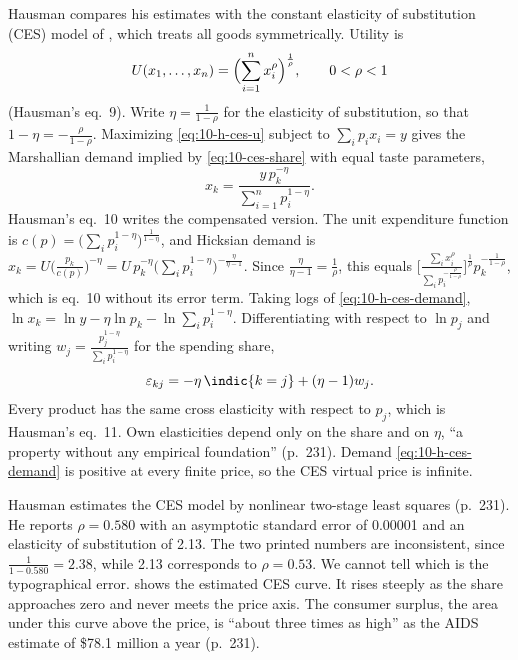Hausman compares his estimates with the constant elasticity of substitution (CES) model of
\citet{DixitStiglitz1977}, which treats all goods symmetrically. Utility is
\begin{equation}\label{eq:10-h-ces-u}
  U(x_1,\dots,x_n) = \Bigl(\sum_{i=1}^{n}x_i^{\rho}\Bigr)^{\frac{1}{\rho}}, \qquad 0 < \rho < 1
\end{equation}
(Hausman's eq.~9). Write $\eta = \frac{1}{1-\rho}$ for the elasticity of substitution, so that
$1 - \eta = -\frac{\rho}{1-\rho}$. Maximizing \eqref{eq:10-h-ces-u} subject to $\sum_i p_ix_i = y$ gives the
Marshallian demand implied by \eqref{eq:10-ces-share} with equal taste parameters,
\begin{equation}\label{eq:10-h-ces-demand}
  x_k = \frac{y\,p_k^{-\eta}}{\sum_{i=1}^{n}p_i^{1-\eta}}.
\end{equation}
Hausman's eq.~10 writes the compensated version. The unit expenditure function is
$c(p) = \bigl(\sum_ip_i^{1-\eta}\bigr)^{\frac{1}{1-\eta}}$, and Hicksian demand is
$x_k = U\bigl(\frac{p_k}{c(p)}\bigr)^{-\eta} = U\,p_k^{-\eta}\bigl(\sum_ip_i^{1-\eta}\bigr)^{-\frac{\eta}{\eta-1}}$.
Since $\frac{\eta}{\eta-1} = \frac{1}{\rho}$, this equals
$\bigl[\frac{\sum_ix_i^{\rho}}{\sum_ip_i^{-\frac{\rho}{1-\rho}}}\bigr]^{\frac{1}{\rho}}p_k^{-\frac{1}{1-\rho}}$, which
is eq.~10 without its error term. Taking logs of \eqref{eq:10-h-ces-demand},
$\ln x_k = \ln y - \eta\ln p_k - \ln\sum_ip_i^{1-\eta}$. Differentiating with respect to $\ln p_j$ and writing
$w_j = \frac{p_j^{1-\eta}}{\sum_ip_i^{1-\eta}}$ for the spending share,
\begin{equation}\label{eq:10-h-ces-elast}
  \varepsilon_{kj} = -\eta\,\indic\{k = j\} + (\eta - 1)w_j.
\end{equation}
Every product has the same cross elasticity with respect to $p_j$, which is Hausman's eq.~11. Own elasticities
depend only on the share and on $\eta$, ``a property without any empirical foundation'' (p.~231). Demand
\eqref{eq:10-h-ces-demand} is positive at every finite price, so the CES virtual price is infinite.

Hausman estimates the CES model by nonlinear two-stage least squares (p.~231). He reports
$\hat\rho = 0.580$ with an asymptotic standard error of 0.00001 and an elasticity of substitution of 2.13.
The two printed numbers are inconsistent, since $\frac{1}{1 - 0.580} = 2.38$, while 2.13 corresponds to
$\rho = 0.53$. We cannot tell which is the typographical error.  shows the
estimated CES curve. It rises steeply as the share approaches zero and never meets the price axis. The
consumer surplus, the area under this curve above the price, is ``about three times as high'' as the AIDS
estimate of \$78.1 million a year (p.~231).

